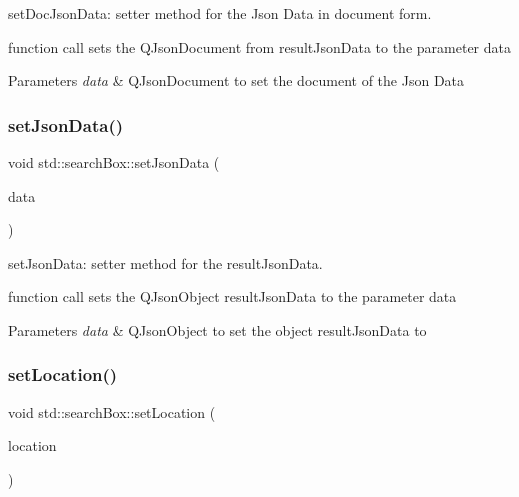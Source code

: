set\+Doc\+Json\+Data\+: setter method for the Json Data in document form. 

function call sets the Q\+Json\+Document from result\+Json\+Data to the parameter data 
\begin{DoxyParams}{Parameters}
{\em data} & Q\+Json\+Document to set the document of the Json Data \\
\hline
\end{DoxyParams}
\mbox{\label{classstd_1_1searchBox_ae5f4b975f9d7958d1748de12777a9aca}} 
\subsubsection{\texorpdfstring{set\+Json\+Data()}{setJsonData()}}
{\footnotesize\ttfamily void std\+::search\+Box\+::set\+Json\+Data (\begin{DoxyParamCaption}\item[{const Q\+Json\+Object \&}]{data }\end{DoxyParamCaption})}



set\+Json\+Data\+: setter method for the result\+Json\+Data. 

function call sets the Q\+Json\+Object result\+Json\+Data to the parameter data 
\begin{DoxyParams}{Parameters}
{\em data} & Q\+Json\+Object to set the object result\+Json\+Data to \\
\hline
\end{DoxyParams}
\mbox{\label{classstd_1_1searchBox_a8c40ff5ea326b88f6efeb31538b1c858}} 
\subsubsection{\texorpdfstring{set\+Location()}{setLocation()}}
{\footnotesize\ttfamily void std\+::search\+Box\+::set\+Location (\begin{DoxyParamCaption}\item[{Q\+String}]{location }\end{DoxyParamCaption})}



